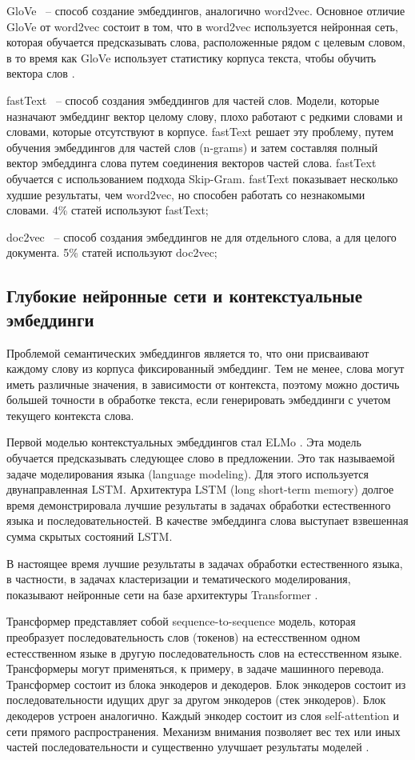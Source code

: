 GloVe ~-- способ создание эмбеддингов, аналогично word2vec. Основное отличие GloVe от word2vec состоит в том, что в word2vec используется нейронная сеть, которая обучается предсказывать слова, расположенные рядом с целевым словом, в то время как GloVe использует статистику корпуса текста, чтобы обучить вектора слов \cite{glove}.

fastText ~-- способ создания эмбеддингов для частей слов. Модели, которые назначают эмбеддинг вектор целому слову, плохо работают с редкими словами  и словами, которые отсутствуют в корпусе. fastText решает эту проблему, путем обучения эмбеддингов для частей слов (n-grams) и затем составляя полный вектор эмбеддинга слова путем соединения векторов частей слова. fastText обучается с использованием подхода Skip-Gram. fastText показывает несколько худшие результаты, чем word2vec, но способен работать со незнакомыми словами. 4\% статей \cite{no-patterns} используют fastText;

doc2vec ~-- способ создания эмбеддингов не для отдельного слова, а для целого документа. 5\% статей \cite{no-patterns} используют doc2vec;

\subsection{Глубокие нейронные сети и контекстуальные эмбеддинги}

Проблемой семантических эмбеддингов является то, что они присваивают каждому слову из корпуса фиксированный эмбеддинг. Тем не менее, слова могут иметь различные значения, в зависимости от контекста, поэтому можно достичь большей точности в обработке текста, если генерировать эмбеддинги с учетом текущего контекста слова.

Первой моделью контекстуальных эмбеддингов стал ELMo \cite{elmo}. Эта модель обучается предсказывать следующее слово в предложении. Это так называемой задаче моделирования языка (language modeling). Для этого используется двунаправленная LSTM. Архитектура LSTM (long short-term memory) долгое время демонстрировала лучшие результаты в задачах обработки естественного языка и последовательностей. В качестве эмбеддинга слова выступает взвешенная сумма скрытых состояний LSTM.

В настоящее время лучшие результаты в задачах обработки естественного языка, в частности, в задачах кластеризации и тематического моделирования, показывают нейронные сети на базе архитектуры Transformer \cite{no-patterns}.

Трансформер представляет собой sequence-to-sequence модель, которая преобразует последовательность слов (токенов) на естесственном одном естесственном языке в другую последовательность слов на естесственном языке. Трансформеры могут применяться, к примеру, в задаче машинного перевода. Трансформер состоит из блока энкодеров и декодеров. Блок энкодеров состоит из последовательности идущих друг за другом энкодеров (стек энкодеров). Блок декодеров устроен аналогично. Каждый энкодер состоит из слоя self-attention и сети прямого распространения. Механизм внимания позволяет вес тех или иных частей последовательности и существенно улучшает результаты моделей \cite{transformer}.

